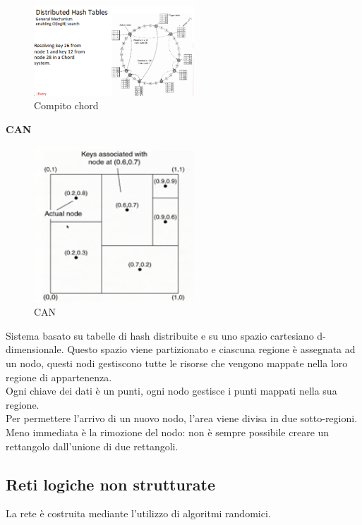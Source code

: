 \documentclass[12pt,italian]{report}
\begin{document}
\begin{figure}[h]
\centering
\includegraphics[width=60mm]{img/compitochord.png}
\caption{Compito chord}
\label{fig:chorddh}
\end{figure}

\bigbreak
\noindent \textbf{CAN}
\begin{figure}[h]
\centering
\includegraphics[width=60mm]{img/can.png}
\caption{CAN}
\label{fig:can}
\end{figure}
Sistema basato su tabelle di hash distribuite e su uno spazio cartesiano d-dimensionale. Questo spazio viene partizionato e ciascuna regione è assegnata ad un nodo, questi nodi gestiscono tutte le risorse che vengono mappate nella loro regione di appartenenza. \\ Ogni chiave dei dati è un punti, ogni nodo gestisce i punti mappati nella sua regione. \\ Per permettere l'arrivo di un nuovo nodo, l'area viene divisa in due sotto-regioni. Meno immediata è la rimozione del nodo: non è sempre possibile creare un rettangolo dall'unione di due rettangoli.

\subsection{Reti logiche non strutturate}
La rete è costruita mediante l'utilizzo di algoritmi randomici. 
\end{document}
